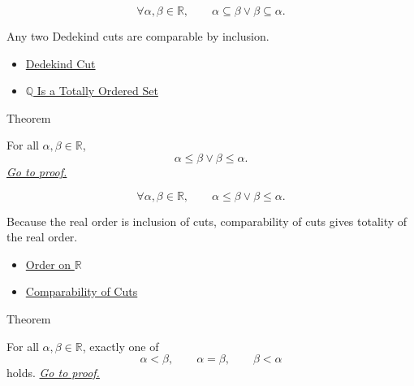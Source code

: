 \begin{remark*}
\[
\forall \alpha,\beta\in\mathbb{R},\qquad
\alpha\subseteq\beta \lor \beta\subseteq\alpha.
\]
\end{remark*}

\begin{remark*}[Interpretation]
Any two Dedekind cuts are comparable by inclusion.
\end{remark*}

\begin{dependencies}
\begin{itemize}
  \item \hyperref[def:dedekind-cut]{Dedekind Cut}
  \item \hyperref[thm:q-totally-ordered-set]{$\mathbb{Q}$ Is a Totally Ordered Set}
\end{itemize}
\end{dependencies}

\begin{theorembox}{Theorem}
\begin{theorem}
\label{thm:order-on-r-total}
For all $\alpha,\beta\in\mathbb{R}$,
\[
\alpha\le\beta\lor\beta\le\alpha.
\]
\hyperref[prf:order-on-r-total]{\textit{Go to proof.}}
\end{theorem}
\end{theorembox}

\begin{remark*}
\[
\forall \alpha,\beta\in\mathbb{R},\qquad
\alpha\le\beta \lor \beta\le\alpha.
\]
\end{remark*}

\begin{remark*}[Interpretation]
Because the real order is inclusion of cuts, comparability of cuts gives totality of the real order.
\end{remark*}

\begin{dependencies}
\begin{itemize}
  \item \hyperref[def:order-on-r]{Order on $\mathbb{R}$}
  \item \hyperref[thm:comparability-of-cuts]{Comparability of Cuts}
\end{itemize}
\end{dependencies}

\begin{theorembox}{Theorem}
\begin{theorem}
\label{thm:trichotomy-on-r}
For all $\alpha,\beta\in\mathbb{R}$, exactly one of
\[
\alpha<\beta,\qquad \alpha=\beta,\qquad \beta<\alpha
\]
holds.
\hyperref[prf:trichotomy-on-r]{\textit{Go to proof.}}
\end{theorem}
\end{theorembox}

